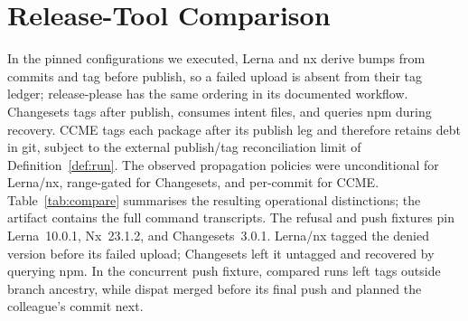 \section{Release-Tool Comparison}
\label{sec:compare}

In the pinned configurations we executed, Lerna and nx derive bumps from
commits and tag before publish, so a failed upload is absent from their tag
ledger; release-please has the same ordering in its documented workflow.
Changesets tags after publish, consumes intent files, and queries npm during
recovery.
CCME tags each package after its publish leg and therefore retains debt in git,
subject to the external publish/tag reconciliation limit of
Definition~\ref{def:run}. The observed propagation policies were unconditional
for Lerna/nx, range-gated for Changesets, and per-commit for CCME.
Table~\ref{tab:compare}
summarises the resulting operational distinctions; the artifact contains the
full command transcripts.
The refusal and push fixtures pin Lerna~10.0.1, Nx~23.1.2, and
Changesets~3.0.1. Lerna/nx tagged the denied version before its failed upload;
Changesets left it untagged and recovered by querying npm. In the concurrent
push fixture, compared runs left tags outside branch ancestry, while dispat
merged before its final push and planned the colleague's commit next.

\begin{table}[t]
\caption{Pinned release-tool configurations.}
\label{tab:compare}
\scriptsize
{}
\end{table}

